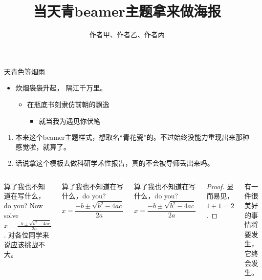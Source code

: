 \documentclass[t,linespread=1.2]{ctexbeamer}
\title{当天青beamer主题拿来做海报}
\author{作者甲、作者乙、作者丙}
\begin{document}
\begin{frame}
    
\frametitle{\insertshorttitle}
\framesubtitle{\insertshortauthor}

\begin{block}{天青色等烟雨}
    \begin{itemize}
        \item 炊烟袅袅升起， 隔江千万里。
        \begin{itemize}
            \item 在瓶底书刻隶仿前朝的飘逸
            \begin{itemize}
                \item 就当我为遇见你伏笔
            \end{itemize}
        \end{itemize}
    \end{itemize}
    
    \begin{enumerate}
        \item 本来这个beamer主题样式，想取名“青花瓷”的。不过始终没能力重现出来那种感觉啦，就算了。
        \item 话说拿这个模板去做科研学术性报告，真的不会被导师丢出来吗。
    \end{enumerate}
\end{block}

\begin{columns}[T]
    
    \begin{exampleblock}{算了我也不知道在写什么，do you?}
        Now solve $x = \frac{-b \pm \sqrt{b^2 -4ac}}{2a}$. 对各位同学来说应该挑战不大。
    \end{exampleblock}
    
    \begin{alertblock}{算了我也不知道在写什么，do you?}
        \[ x = \frac{-b \pm \sqrt{b^2 -4ac}}{2a} \]
    \end{alertblock}
    
    \begin{block}{算了我也不知道在写什么，do you?}
        \[ x = \frac{-b \pm \sqrt{b^2 -4ac}}{2a} \]
    \end{block}
    
    \begin{proof}
        显而易见，$1+1=2$.
    \end{proof}
    
    \begin{theorem}
        有一件很美好的事情将要发生，它终会发生。
    \end{theorem}
    

\end{columns}
\end{frame}
\end{document}
